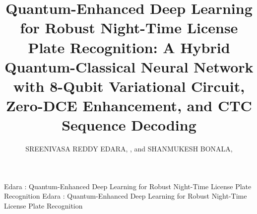 \documentclass{ieeeaccess}
\begin{document}

\title{Quantum-Enhanced Deep Learning for Robust Night-Time License Plate Recognition: A Hybrid Quantum-Classical Neural Network with 8-Qubit Variational Circuit, Zero-DCE Enhancement, and CTC Sequence Decoding}

\author{\uppercase{Sreenivasa Reddy Edara}, ,
and \uppercase{Shanmukesh Bonala}, }

\address[1]{School of Computer Science and Engineering (SCOPE), VIT-AP University Amaravati, Andhra Pradesh, India, 522241 (e-mail: sreenivasareddy.e@vitap.ac.in, ORCID: 0000-0001-7347-2680)}
\address[2]{School of Computer Science and Engineering (SCOPE), VIT-AP University Amaravati, Andhra Pradesh, India, 522241 (e-mail: Shanmukesh.23BCE20070@vitapstudent.ac.in, ORCID: 0009-0008-3651-4077)}


\markboth
{Edara \headeretal: Quantum-Enhanced Deep Learning for Robust Night-Time License Plate Recognition}
{Edara \headeretal: Quantum-Enhanced Deep Learning for Robust Night-Time License Plate Recognition}

\end{document}
